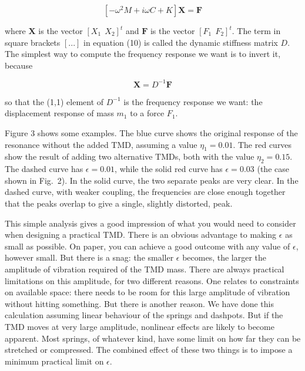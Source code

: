   $$[-\omega^2 M + i \omega C +K] \textbf{X} = \textbf{F} \tag{10}$$ 

  where $\textbf{X}$ is the vector $[X_1~~X_2]^t$ and $\textbf{F}$ is the 
  vector $[F_1~~F_2]^t$. The term in square brackets $[...]$ in equation (10) 
  is called the dynamic stiffness matrix $D$. The simplest way to compute the 
  frequency response we want is to invert it, because 

  $$\textbf{X} = D^{-1} \textbf{F} \tag{11}$$ 

  so that the (1,1) element of $D^{-1}$ is the frequency response we want: the 
  displacement response of mass $m_1$ to a force $F_1$. 

  Figure 3 shows some examples. The blue curve shows the original response of 
  the resonance without the added TMD, assuming a value $\eta_1 = 0.01$. The 
  red curves show the result of adding two alternative TMDs, both with the 
  value $\eta_2 = 0.15$. The dashed curve has $\epsilon = 0.01$, while the 
  solid red curve has $\epsilon = 0.03$ (the case shown in Fig.\ 2). In the 
  solid curve, the two separate peaks are very clear. In the dashed curve, with 
  weaker coupling, the frequencies are close enough together that the peaks 
  overlap to give a single, slightly distorted, peak. 


  This simple analysis gives a good impression of what you would need to 
  consider when designing a practical TMD. There is an obvious advantage to 
  making $\epsilon$ as small as possible. On paper, you can achieve a good 
  outcome with any value of $\epsilon$, however small. But there is a snag: the 
  smaller $\epsilon$ becomes, the larger the amplitude of vibration required of 
  the TMD mass. There are always practical limitations on this amplitude, for 
  two different reasons. One relates to constraints on available space: there 
  needs to be room for this large amplitude of vibration without hitting 
  something. But there is another reason. We have done this calculation 
  assuming linear behaviour of the springs and dashpots. But if the TMD moves 
  at very large amplitude, nonlinear effects are likely to become apparent. 
  Most springs, of whatever kind, have some limit on how far they can be 
  stretched or compressed. The combined effect of these two things is to impose 
  a minimum practical limit on $\epsilon$. 

